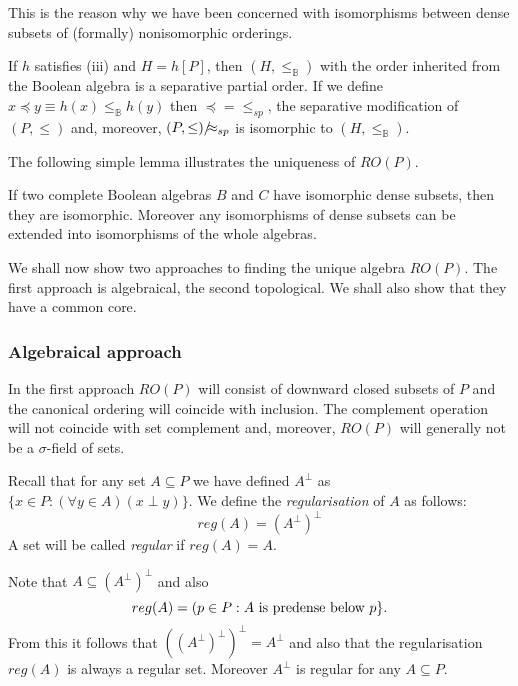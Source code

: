 This is the reason why we have been concerned with isomorphisms between dense subsets of (formally) nonisomorphic orderings.

If $h$ satisfies (iii) and $H=h[P]$, then $(H,\leq_{{ \mathbb B}})$ with the order inherited from the Boolean algebra is a separative
partial order. If we define $x\preceq y\equiv h(x)\leq_{{ \mathbb B}}h(y)$ then $\preceq=\leq_{sp}$, the separative modification
of $(P,\leq)$ and, moreover, $(P,\leq)/\hskip-2mm\approx_{sp}$ is isomorphic to $(H,\leq_{{ \mathbb B}})$.



The following simple lemma illustrates the uniqueness of $RO(P)$.

\begin{lemma} If two complete Boolean algebras $B$ and $C$ have isomorphic dense subsets,
then they are isomorphic. Moreover any isomorphisms of dense subsets can be extended into
isomorphisms of the whole algebras.
\end{lemma}

We shall now show two approaches to finding the unique algebra $RO(P)$. The first approach is algebraical, the second topological.
We shall also show that they have a common core.

\subsubsection{Algebraical approach}
In the first approach $RO(P)$ will consist of downward closed subsets of $P$ and the canonical ordering will coincide with inclusion.
The complement operation will not coincide with set complement and, moreover, $RO(P)$ will generally not be a $\sigma$-field of sets.

\begin{definition}[Regularisation]\label{Regularisation}
Recall that for any set $A\subseteq P$ we have defined $A^{\perp}$ as $\{x\in P:(\forall y\in A)(x\perp y)\}$. We define
the \emph{regularisation} of $A$ as follows:
$$ %
 reg(A)=(A^{\perp})^{\perp}
$$ %
A set will be called \emph{regular} if $reg(A)=A$.
\end{definition}

Note that $A\subseteq (A^{\perp})^{\perp}$ and also
$$ %
 reg(A)=(p\in P:A\ \hbox{is predense below}\ p\}.
$$ %
From this it follows that $((A^{\perp})^{\perp})^{\perp}=A^{\perp}$ and also that
the regularisation $reg(A)$ is always a regular set. Moreover $A^{\perp}$ is regular
for any $A\subseteq P$.

